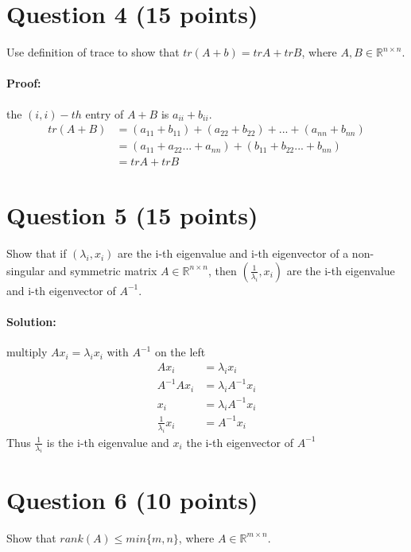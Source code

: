 \documentclass[
	10pt, %
]{../fphw}
\begin{document}
	\section*{Question 4 (15 points)}
	\begin{problem}
		Use definition of trace to show that $tr(A+b)=trA + trB$, where $A,B \in \mathbb{R}^{n \times n}$.
	\end{problem}
	\paragraph{Proof:} the $(i,i)-th$ entry of $A+B$ is $a_{ii}+b_{ii}$.
	\begin{align*}
		tr(A+B) &= (a_{11}+b_{11})+(a_{22}+b_{22})+...+(a_{nn}+b_{nn}) \\
		&= (a_{11}+a_{22}...+a_{nn})+(b_{11}+b_{22}...+b_{nn}) \\
		&= trA + trB
	\end{align*}
	
	\section*{Question 5 (15 points)}
	\begin{problem}
	Show that if $(\lambda_i,x_i)$ are the i-th eigenvalue and i-th eigenvector of a non-singular and symmetric matrix $A \in \mathbb{R}^{n \times n}$, then $(\frac{1}{\lambda_i},x_i)$ are the i-th eigenvalue and i-th eigenvector of $A^{-1}$.
	\end{problem}
	\paragraph{Solution:} multiply $Ax_i=\lambda_i x_i$ with $A^{-1}$ on the left
	\begin{align*}
		Ax_i &= \lambda_i x_i \\
		A^{-1}Ax_i &= \lambda_i A^{-1} x_i \\
		x_i &= \lambda_i A^{-1} x_i \\
		\frac{1}{\lambda_i}x_i &= A^{-1}x_i
	\end{align*}
	Thus $\frac{1}{\lambda_i}$ is the i-th eigenvalue and $x_i$ the i-th eigenvector of $A^{-1}$

	\section*{Question 6 (10 points)}
	\begin{problem}
		Show that $rank(A)\leq min\{m,n\}$, where $A \in \mathbb{R}^{m \times n}$.
	\end{problem}
\end{document}
